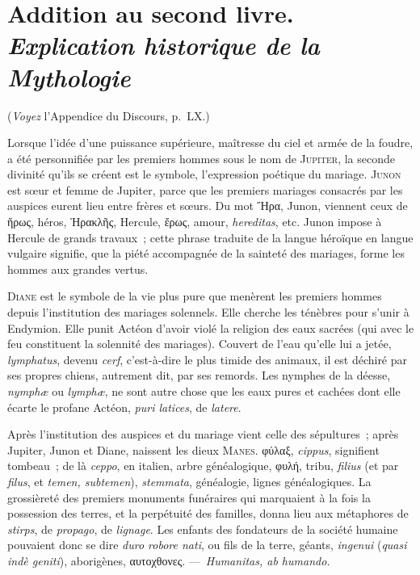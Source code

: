 \documentclass[french,twoside]{book} %
\newcommand\chapteropen{} %
\newcommand\chaptercont{} %
\newcommand\chapterclose{} %
\begin{document}
\chapterclose


\chapteropen
\chapter[{Addition au second livre. Explication historique de la Mythologie}]{Addition au second livre. \\
{\itshape Explication historique de la Mythologie}}

\chaptercont
\noindent ({\itshape Voyez} l’Appendice du Discours, p. LX.)\par
 Lorsque l’idée d’une puissance supérieure, maîtresse du ciel et armée de la foudre, a été personnifiée par les premiers hommes sous le nom de {\scshape Jupiter}, la seconde divinité qu’ils se créent est le symbole, l’expression poétique du mariage. {\scshape Junon} est sœur et femme de Jupiter, parce que les premiers mariages consacrés par les auspices eurent lieu entre frères et sœurs. Du mot Ἥρα, Junon, viennent ceux de ἥρως, héros, Ἡρακλῆς, Hercule, ἔρως, amour, {\itshape hereditas}, etc. Junon impose à Hercule de grands travaux ; cette phrase traduite de la langue héroïque en langue vulgaire signifie, que la piété accompagnée de la sainteté des mariages, forme les hommes aux grandes vertus.\par
{\scshape Diane} est le symbole de la vie plus pure que menèrent les premiers hommes depuis l’institution des mariages solennels. Elle cherche les ténèbres pour s’unir à Endymion. Elle punit Actéon d’avoir violé la religion des eaux sacrées (qui avec le feu constituent la solennité des mariages). Couvert de l’eau qu’elle lui a jetée, {\itshape lymphatus}, devenu {\itshape cerf}, c’est-à-dire le plus timide des animaux, il est déchiré par ses propres chiens, autrement dit, par ses remords. Les nymphes de la déesse, {\itshape nymphæ} ou {\itshape lymphæ}, ne sont autre chose que les eaux pures et cachées dont elle écarte le profane Actéon, {\itshape puri latices}, de {\itshape latere}.\par
Après l’institution des auspices et du mariage vient celle des sépultures ; après Jupiter, Junon et Diane, naissent les dieux {\scshape Manes}. φύλαξ, {\itshape cippus}, signifient tombeau ; de là {\itshape ceppo}, en italien, arbre généalogique, φυλή, tribu, {\itshape filius} (et par {\itshape filus}, et {\itshape temen, subtemen}), {\itshape stemmata}, généalogie, lignes généalogiques. La grossièreté des premiers monuments funéraires qui marquaient à la fois la possession des terres, et la  perpétuité des familles, donna lieu aux métaphores de {\itshape stirps}, de {\itshape propago}, de {\itshape lignage}. Les enfants des fondateurs de la société humaine pouvaient donc se dire {\itshape duro robore nati}, ou fils de la terre, géants, {\itshape ingenui} ({\itshape quasi indè geniti}), aborigènes, αυτοχθονες. — {\itshape Humanitas, ab humando.}\par
\end{document}
